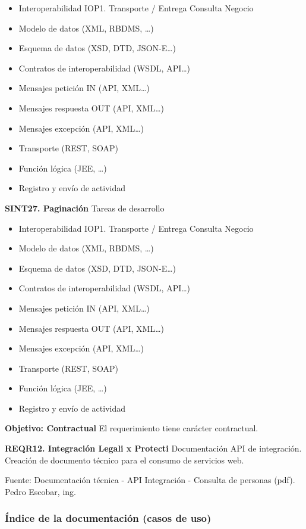 \documentclass[
  paper=a4,
  ,captions=tableheading
]{scrartcl}
\providecommand{\tightlist}{%
  \setlength{\itemsep}{0pt}\setlength{\parskip}{0pt}}
\begin{document}
\begin{itemize}
\tightlist
\item
  Interoperabilidad IOP1. Transporte / Entrega Consulta Negocio
\item
  Modelo de datos (XML, RBDMS, \ldots)
\item
  Esquema de datos (XSD, DTD, JSON-E\ldots)
\item
  Contratos de interoperabilidad (WSDL, API\ldots)
\item
  Mensajes petición IN (API, XML\ldots)
\item
  Mensajes respuesta OUT (API, XML\ldots)
\item
  Mensajes excepción (API, XML\ldots)
\item
  Transporte (REST, SOAP)
\item
  Función lógica (JEE, \ldots)
\item
  Registro y envío de actividad
\end{itemize}

\textbf{SINT27. Paginación} Tareas de desarrollo

\begin{itemize}
\tightlist
\item
  Interoperabilidad IOP1. Transporte / Entrega Consulta Negocio
\item
  Modelo de datos (XML, RBDMS, \ldots)
\item
  Esquema de datos (XSD, DTD, JSON-E\ldots)
\item
  Contratos de interoperabilidad (WSDL, API\ldots)
\item
  Mensajes petición IN (API, XML\ldots)
\item
  Mensajes respuesta OUT (API, XML\ldots)
\item
  Mensajes excepción (API, XML\ldots)
\item
  Transporte (REST, SOAP)
\item
  Función lógica (JEE, \ldots)
\item
  Registro y envío de actividad
\end{itemize}

\textbf{Objetivo: Contractual} El requerimiento tiene carácter
contractual.

\textbf{REQR12. Integración Legali x Protecti} Documentación API de
integración. Creación de documento técnico para el consumo de servicios
web.

Fuente: Documentación técnica - API Integración - Consulta de personas
(pdf). Pedro Escobar, ing.

\subsubsection{Índice de la documentación (casos de
uso)}\label{sec:uxedndice-de-la-documentaciuxf3n-casos-de-uso-2}
\end{document}

